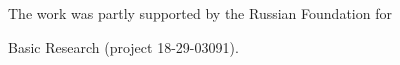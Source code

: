 




\Ack


\noindent


The work was partly supported by the Russian Foundation for


Basic Research (project 18-29-03091).





 








\renewcommand{\bibname}{\protect\rmfamily References}







